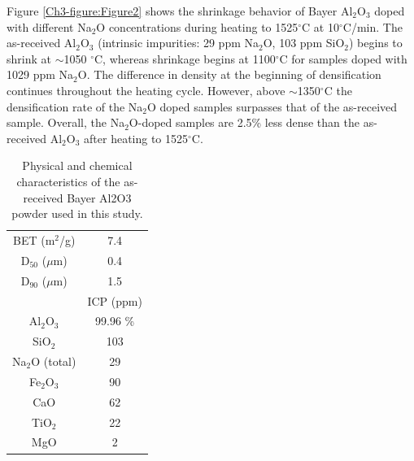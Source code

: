 Figure \ref{Ch3-figure:Figure2} shows the shrinkage behavior of Bayer Al$_{2}$O$_{3}$ doped with different Na$_{2}$O concentrations during heating to 1525$^{\circ}$C at 10$^{\circ}$C/min. The as-received Al$_{2}$O$_{3}$ (intrinsic impurities: 29 ppm Na$_{2}$O, 103 ppm SiO$_{2}$) begins to shrink at $\sim$1050 $^{\circ}$C, whereas shrinkage begins at 1100$^{\circ}$C for samples doped with 1029 ppm Na$_{2}$O. The difference in density at the beginning of densification continues throughout the heating cycle. However, above $\sim$1350$^{\circ}$C the densification rate of the Na$_{2}$O doped samples surpasses that of the as-received sample. Overall, the Na$_{2}$O-doped samples are 2.5\% less dense than the as-received Al$_{2}$O$_{3}$ after heating to 1525$^{\circ}$C.



\newpage
\begin{table}[H]
	\caption{Physical and chemical characteristics of the as-received Bayer Al2O3 powder used in this study.}
	\centering
	\begin{tabular}{ | c | c | }
		\hline
		 & \\
		\hline
		BET (m$^{2}$/g) & 7.4 \\
		\hline
		D$_{50}$ ($\mu$m) & 0.4 \\
		\hline
		D$_{90}$ ($\mu$m) & 1.5 \\
		\hline
		 & ICP (ppm) \\
		\hline
		Al$_{2}$O$_{3}$ & 99.96 \% \\
		\hline
		SiO$_{2}$ & 103 \\
		\hline
		Na$_{2}$O (total) & 29 \\
		\hline
		Fe$_{2}$O$_{3}$ & 90 \\
		\hline
		CaO & 62 \\
		\hline
		TiO$_{2}$ & 22 \\
		\hline
		MgO & 2 \\
		\hline
	\end{tabular}
	\label{Ch3-table:chembayer}
\end{table}
\clearpage

